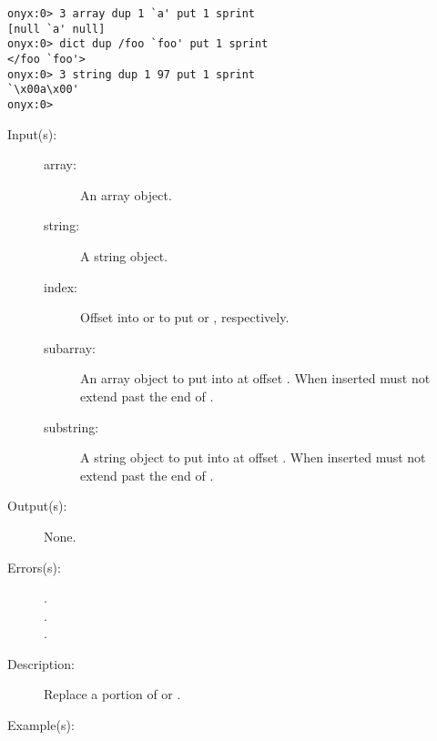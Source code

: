 \begin{description}
\begin{description}
\begin{verbatim}
onyx:0> 3 array dup 1 `a' put 1 sprint
[null `a' null]
onyx:0> dict dup /foo `foo' put 1 sprint
</foo `foo'>
onyx:0> 3 string dup 1 97 put 1 sprint
`\x00a\x00'
onyx:0>
		\end{verbatim}
	\end{description}
\label{systemdict:putinterval}
\item[{\onyxop{array index subarray}{putinterval}{--}}: ]
\item[{\onyxop{string index substring}{putinterval}{--}}: ]
	\begin{description}\item[]
	\item[Input(s): ]
		\begin{description}\item[]
		\item[array: ]
			An array object.
		\item[string: ]
			A string object.
		\item[index: ]
			Offset into  or  to put
			 or , respectively.
		\item[subarray: ]
			An array object to put into  at offset
			.  When inserted  must not
			extend past the end of .
		\item[substring: ]
			A string object to put into  at offset
			.  When inserted  must not
			extend past the end of .
		\end{description}
	\item[Output(s): ] None.
	\item[Errors(s): ]
		\begin{description}\item[]
		\item[.]
		\item[.]
		\item[.]
		\end{description}
	\item[Description: ]
		Replace a portion of  or .
	\item[Example(s): ]\begin{verbatim}


\end{verbatim}
\end{description}
\end{description}
